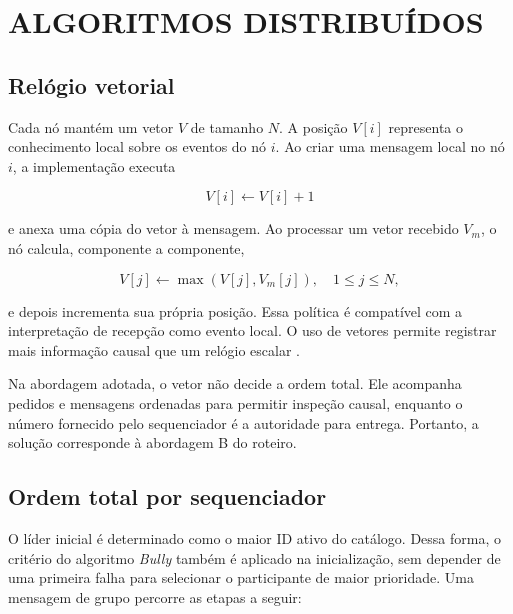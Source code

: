 \chapter{ALGORITMOS DISTRIBUÍDOS}\label{chap:algoritmos}

\section{Relógio vetorial}

Cada nó mantém um vetor $V$ de tamanho $N$. A posição $V[i]$ representa o
conhecimento local sobre os eventos do nó $i$. Ao criar uma mensagem local no nó
$i$, a implementação executa

\begin{equation}
    V[i] \leftarrow V[i] + 1
\end{equation}

e anexa uma cópia do vetor à mensagem. Ao processar um vetor recebido $V_m$, o nó
calcula, componente a componente,

\begin{equation}
    V[j] \leftarrow \max(V[j], V_m[j]), \quad 1 \leq j \leq N,
\end{equation}

e depois incrementa sua própria posição. Essa política é compatível com a
interpretação de recepção como evento local. O uso de vetores permite registrar
mais informação causal que um relógio escalar \cite{coulouris2011}.

Na abordagem adotada, o vetor não decide a ordem total. Ele acompanha pedidos e
mensagens ordenadas para permitir inspeção causal, enquanto o número fornecido
pelo sequenciador é a autoridade para entrega. Portanto, a solução corresponde à
abordagem B do roteiro.

\section{Ordem total por sequenciador}\label{sec:ordem-total}

O líder inicial é determinado como o maior ID ativo do catálogo. Dessa forma, o
critério do algoritmo \textit{Bully} também é aplicado na inicialização, sem depender
de uma primeira falha para selecionar o participante de maior prioridade. Uma
mensagem de grupo percorre as etapas a seguir:

